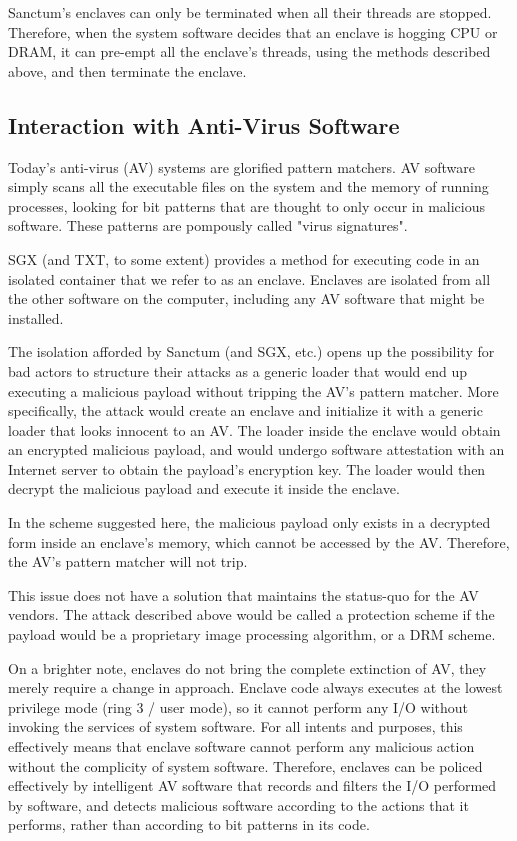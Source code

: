 Sanctum's enclaves can only be terminated when all their threads are stopped.
Therefore, when the system software decides that an enclave is hogging CPU or
DRAM, it can pre-empt all the enclave's threads, using the methods described
above, and then terminate the enclave.


\subsection{Interaction with Anti-Virus Software}

Today's anti-virus (AV) systems are glorified pattern matchers. AV software
simply scans all the executable files on the system and the memory of running
processes, looking for bit patterns that are thought to only occur in malicious
software. These patterns are pompously called "virus signatures".

SGX (and TXT, to some extent) provides a method for executing code in an
isolated container that we refer to as an enclave. Enclaves are isolated from
all the other software on the computer, including any AV software that might be
installed.

The isolation afforded by Sanctum (and SGX, etc.) opens up the possibility for
bad actors to structure their attacks as a generic loader that would end up
executing a malicious payload without tripping the AV's pattern matcher.  More
specifically, the attack would create an enclave and initialize it with a
generic loader that looks innocent to an AV. The loader inside the enclave
would obtain an encrypted malicious payload, and would undergo software
attestation with an Internet server to obtain the payload's encryption key. The
loader would then decrypt the malicious payload and execute it inside the
enclave.

In the scheme suggested here, the malicious payload only exists in a decrypted
form inside an enclave's memory, which cannot be accessed by the AV. Therefore,
the AV's pattern matcher will not trip.

This issue does not have a solution that maintains the status-quo for the AV
vendors. The attack described above would be called a protection scheme if the
payload would be a proprietary image processing algorithm, or a DRM scheme.

On a brighter note, enclaves do not bring the complete extinction of AV, they
merely require a change in approach. Enclave code always executes at the lowest
privilege mode (ring 3 / user mode), so it cannot perform any I/O without
invoking the services of system software. For all intents and purposes, this
effectively means that enclave software cannot perform any malicious action
without the complicity of system software. Therefore, enclaves can be policed
effectively by intelligent AV software that records and filters the I/O
performed by software, and detects malicious software according to the actions
that it performs, rather than according to bit patterns in its code.

